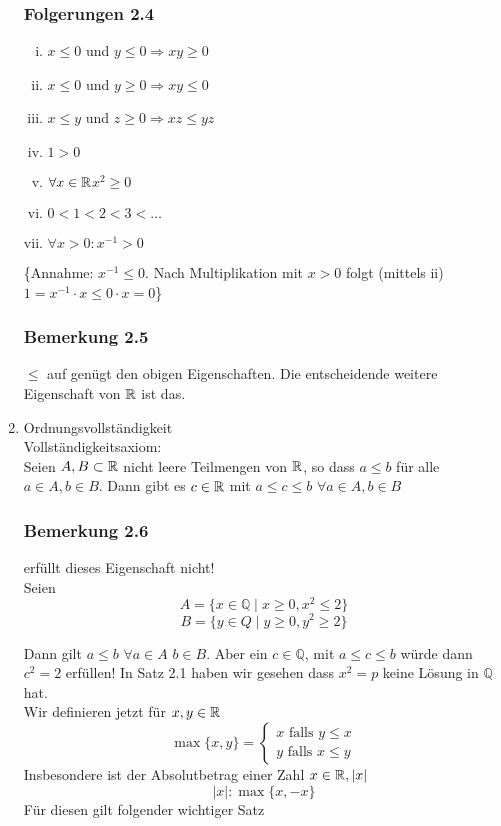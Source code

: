 \begin{enumerate}
\subsubsection*{Folgerungen 2.4}
\begin{enumerate}[i)]
\item $x\leq 0$ und $y\leq 0 \Rightarrow xy\geq 0$
\item $x\leq 0$ und $y\geq 0\Rightarrow xy\leq 0$
\item $x\leq y$ und $z\geq 0\Rightarrow xz\leq yz$
\item $1>0$
\item $\forall x\in\mathbb{R}$\hspace{10mm}$x^2\geq 0$
\item $0<1<2<3<\dots$
\item $\forall x>0: x^{-1}>0$
\end{enumerate}
\{Annahme: $x^{-1}\leq 0$. Nach Multiplikation mit $x>0$ folgt (mittels ii) $1=x^{-1}\cdot x\leq 0\cdot x=0$\}
\subsubsection*{Bemerkung 2.5}
$\leq$ auf  genügt den obigen Eigenschaften. Die entscheidende weitere Eigenschaft von $\mathbb{R}$ ist das.
\item Ordnungsvollständigkeit\\
Vollständigkeitsaxiom:\\
Seien $A,B\subset\mathbb{R}$ nicht leere Teilmengen von $\mathbb{R}$, so dass $a\leq b$ für alle $a\in A,b\in B$. Dann gibt es $c\in\mathbb{R}$ mit $a\leq c\leq b$\hspace{5mm} $\forall a\in A,b\in B$
\subsubsection*{Bemerkung 2.6}
 erfüllt dieses Eigenschaft nicht!\\


Seien \[A=\{x\in\mathbb{Q}\mid x\geq 0, x^2\leq 2\}\] \[B=\{y\in Q\mid y\geq 0, y^2 \geq 2\}\]

Dann gilt $a\leq b$ $\forall a\in A$ $b\in B$. Aber ein $c\in\mathbb{Q}$, mit $a\leq c\leq b$ würde dann $c^2=2$ erfüllen! In Satz 2.1 haben wir gesehen dass $x^2=p$ keine Lösung in $\mathbb{Q}$ hat. \\

Wir definieren jetzt für $x,y\in\mathbb{R}$ \[\max \{ x,y\}  = \left\{ {\begin{array}{*{20}{c}}
{x\text{ falls }y \le x}\\
{y\text{ falls }x \le y}
\end{array}} \right.\] Insbesondere ist der Absolutbetrag einer Zahl $x\in\mathbb{R}, \left| x \right|$ \[\left| x \right|:\max \{x,-x\}\] Für diesen gilt folgender wichtiger Satz

\end{enumerate}
